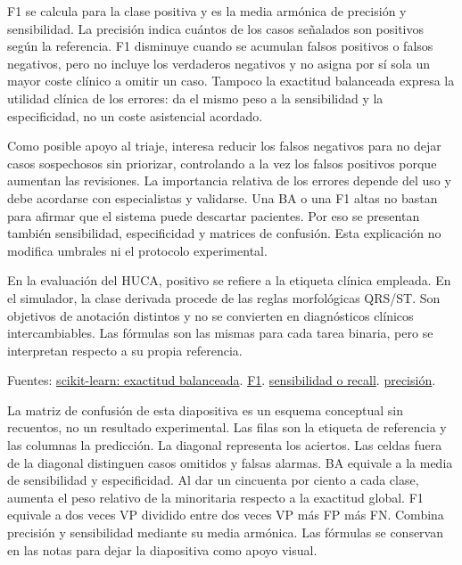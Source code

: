\documentclass[11pt,a4paper]{article}
\begin{document}
F1 se calcula para la clase positiva y es la media armónica de precisión y sensibilidad. La precisión indica cuántos de los casos señalados son positivos según la referencia. F1 disminuye cuando se acumulan falsos positivos o falsos negativos, pero no incluye los verdaderos negativos y no asigna por sí sola un mayor coste clínico a omitir un caso. Tampoco la exactitud balanceada expresa la utilidad clínica de los errores: da el mismo peso a la sensibilidad y la especificidad, no un coste asistencial acordado.

Como posible apoyo al triaje, interesa reducir los falsos negativos para no dejar casos sospechosos sin priorizar, controlando a la vez los falsos positivos porque aumentan las revisiones. La importancia relativa de los errores depende del uso y debe acordarse con especialistas y validarse. Una BA o una F1 altas no bastan para afirmar que el sistema puede descartar pacientes. Por eso se presentan también sensibilidad, especificidad y matrices de confusión. Esta explicación no modifica umbrales ni el protocolo experimental.

En la evaluación del HUCA, positivo se refiere a la etiqueta clínica empleada. En el simulador, la clase derivada procede de las reglas morfológicas QRS/ST. Son objetivos de anotación distintos y no se convierten en diagnósticos clínicos intercambiables. Las fórmulas son las mismas para cada tarea binaria, pero se interpretan respecto a su propia referencia.

Fuentes: \href{https://scikit-learn.org/stable/modules/generated/sklearn.metrics.balanced_accuracy_score.html}{scikit-learn: exactitud balanceada}. \href{https://scikit-learn.org/stable/modules/generated/sklearn.metrics.f1_score.html}{F1}. \href{https://scikit-learn.org/stable/modules/generated/sklearn.metrics.recall_score.html}{sensibilidad o recall}. \href{https://scikit-learn.org/stable/modules/generated/sklearn.metrics.precision_score.html}{precisión}.

La matriz de confusión de esta diapositiva es un esquema conceptual sin recuentos, no un resultado experimental. Las filas son la etiqueta de referencia y las columnas la predicción. La diagonal representa los aciertos. Las celdas fuera de la diagonal distinguen casos omitidos y falsas alarmas. BA equivale a la media de sensibilidad y especificidad. Al dar un cincuenta por ciento a cada clase, aumenta el peso relativo de la minoritaria respecto a la exactitud global. F1 equivale a dos veces VP dividido entre dos veces VP más FP más FN. Combina precisión y sensibilidad mediante su media armónica. Las fórmulas se conservan en las notas para dejar la diapositiva como apoyo visual.
\end{document}
